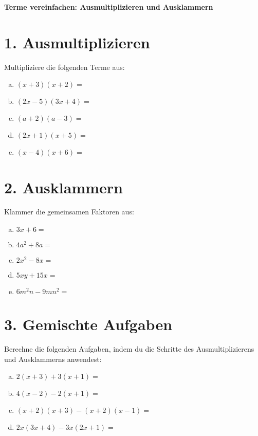 \textbf{Terme vereinfachen: Ausmultiplizieren und Ausklammern}

\section*{1. Ausmultiplizieren}

Multipliziere die folgenden Terme aus:

\begin{enumerate}[a)]
    \item $ (x + 3)(x + 2) = $
    \item $ (2x - 5)(3x + 4) = $
    \item $ (a + 2)(a - 3) = $
    \item $ (2x + 1)(x + 5) = $
    \item $ (x - 4)(x + 6) = $
\end{enumerate}

\section*{2. Ausklammern}

Klammer die gemeinsamen Faktoren aus:

\begin{enumerate}[a)]
    \item $ 3x + 6 = $
    \item $ 4a^2 + 8a = $
    \item $ 2x^2 - 8x = $
    \item $ 5xy + 15x = $
    \item $ 6m^2n - 9mn^2 = $
\end{enumerate}

\section*{3. Gemischte Aufgaben}

Berechne die folgenden Aufgaben, indem du die Schritte des Ausmultiplizierens und Ausklammerns anwendest:

\begin{enumerate}[a)]
    \item $ 2(x + 3) + 3(x + 1) = $
    \item $ 4(x - 2) - 2(x + 1) = $
    \item $ (x + 2)(x + 3) - (x + 2)(x - 1) = $
    \item $ 2x(3x + 4) - 3x(2x + 1) = $
\end{enumerate}